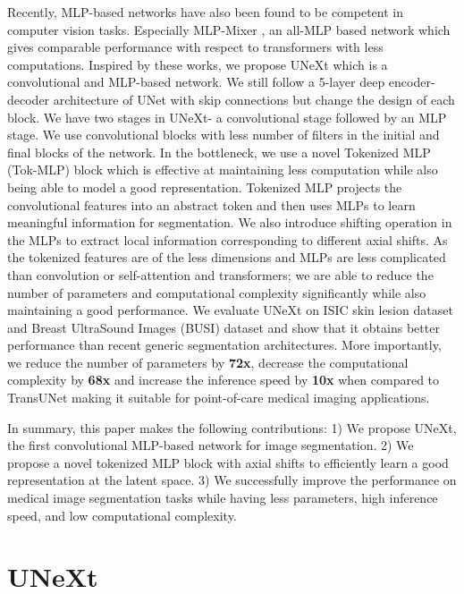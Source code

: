 \documentclass[runningheads]{llncs}
\begin{document}
Recently, MLP-based networks \cite{yu2022s2,touvron2021resmlp,lian2021mlp,tolstikhin2021mlp} have also been found to be competent in computer vision tasks. Especially MLP-Mixer \cite{tolstikhin2021mlp}, an all-MLP based network which gives comparable performance with respect to transformers with less computations. Inspired by these works, we propose UNeXt which is a convolutional and MLP-based network. We still follow a 5-layer deep encoder-decoder architecture of UNet with skip connections but change the design of each block. We have two stages in UNeXt- a convolutional stage followed by an MLP stage. We use convolutional blocks with less number of filters in the initial and final blocks of the network. In the bottleneck, we use a novel Tokenized MLP (Tok-MLP) block which is effective at maintaining less computation while also being able to model a good representation. Tokenized MLP projects the convolutional features into an abstract token and then uses MLPs to learn meaningful information for segmentation. We also introduce shifting operation in the MLPs to extract local information corresponding to different axial shifts. As the tokenized features are of the less dimensions and MLPs are less complicated than convolution or self-attention and transformers; we are able to reduce the number of parameters and computational complexity significantly while also maintaining a good performance. We evaluate UNeXt on ISIC skin lesion dataset \cite{codella2018skin} and Breast UltraSound Images (BUSI) dataset \cite{al2020dataset} and show that it obtains better performance than recent generic segmentation architectures. More importantly, we reduce the number of parameters by \textbf{72x}, decrease the computational complexity by \textbf{68x}  and increase the inference speed by \textbf{10x} when compared to TransUNet making it suitable for point-of-care medical imaging applications. 

In summary, this paper makes the following  contributions: 1) We propose UNeXt, the first convolutional MLP-based network for image segmentation. 2) We propose a novel tokenized MLP block with axial shifts to efficiently learn a good representation at the latent space. 3) We successfully improve the performance on medical image segmentation tasks while having less parameters, high inference speed, and low computational complexity. 

\section{UNeXt}
\end{document}
